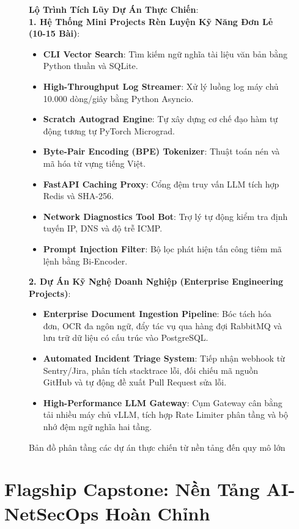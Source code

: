 \begin{figure}[htbp]
\centering
\begin{tcolorbox}[colback=boxbg,colframe=primarycolor,width=0.95\textwidth,arc=2pt]
\small
\textbf{Lộ Trình Tích Lũy Dự Án Thực Chiến}:\\[0.2cm]
\textbf{1. Hệ Thống Mini Projects Rèn Luyện Kỹ Năng Đơn Lẻ (10-15 Bài)}:
\begin{itemize}
  \item \textbf{CLI Vector Search}: Tìm kiếm ngữ nghĩa tài liệu văn bản bằng Python thuần và SQLite.
  \item \textbf{High-Throughput Log Streamer}: Xử lý luồng log máy chủ 10.000 dòng/giây bằng Python Asyncio.
  \item \textbf{Scratch Autograd Engine}: Tự xây dựng cơ chế đạo hàm tự động tương tự PyTorch Micrograd.
  \item \textbf{Byte-Pair Encoding (BPE) Tokenizer}: Thuật toán nén và mã hóa từ vựng tiếng Việt.
  \item \textbf{FastAPI Caching Proxy}: Cổng đệm truy vấn LLM tích hợp Redis và SHA-256.
  \item \textbf{Network Diagnostics Tool Bot}: Trợ lý tự động kiểm tra định tuyến IP, DNS và độ trễ ICMP.
  \item \textbf{Prompt Injection Filter}: Bộ lọc phát hiện tấn công tiêm mã lệnh bằng Bi-Encoder.
\end{itemize}
\textbf{2. Dự Án Kỹ Nghệ Doanh Nghiệp (Enterprise Engineering Projects)}:
\begin{itemize}
  \item \textbf{Enterprise Document Ingestion Pipeline}: Bóc tách hóa đơn, OCR đa ngôn ngữ, đẩy tác vụ qua hàng đợi RabbitMQ và lưu trữ dữ liệu có cấu trúc vào PostgreSQL.
  \item \textbf{Automated Incident Triage System}: Tiếp nhận webhook từ Sentry/Jira, phân tích stacktrace lỗi, đối chiếu mã nguồn GitHub và tự động đề xuất Pull Request sửa lỗi.
  \item \textbf{High-Performance LLM Gateway}: Cụm Gateway cân bằng tải nhiều máy chủ vLLM, tích hợp Rate Limiter phân tầng và bộ nhớ đệm ngữ nghĩa hai tầng.
\end{itemize}
\end{tcolorbox}
\caption{Bản đồ phân tầng các dự án thực chiến từ nền tảng đến quy mô lớn}
\label{fig:capstone-projects-map}
\end{figure}

\section{Flagship Capstone: Nền Tảng AI-NetSecOps Hoàn Chỉnh}
\label{sec:capstone-flagship}

